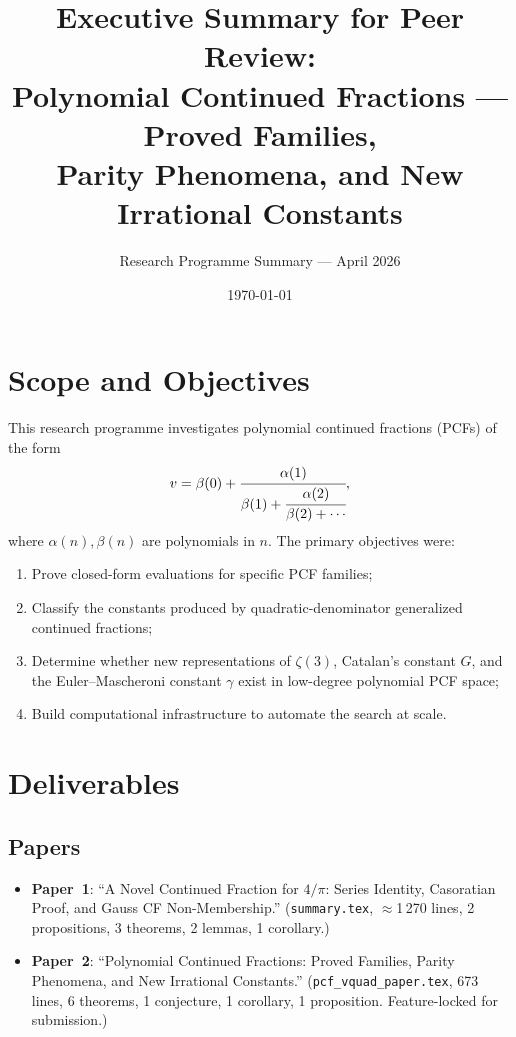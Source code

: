 \documentclass[11pt,a4paper]{article}
\title{Executive Summary for Peer Review:\\
Polynomial Continued Fractions — Proved Families,\\Parity Phenomena, and New Irrational Constants}
\author{Research Programme Summary — April 2026}
\date{\today}
\begin{document}
\maketitle

\section{Scope and Objectives}

This research programme investigates polynomial continued fractions (PCFs) of the form
\[
  v = \beta(0) + \cfrac{\alpha(1)}{\beta(1) + \cfrac{\alpha(2)}{\beta(2) + \cdots}},
\]
where $\alpha(n), \beta(n)$ are polynomials in $n$.  The primary objectives were:
\begin{enumerate}
\item Prove closed-form evaluations for specific PCF families;
\item Classify the constants produced by quadratic-denominator generalized continued fractions;
\item Determine whether new representations of $\zeta(3)$, Catalan's constant $G$, and the Euler--Mascheroni constant $\gamma$ exist in low-degree polynomial PCF space;
\item Build computational infrastructure to automate the search at scale.
\end{enumerate}

\section{Deliverables}

\subsection{Papers}
\begin{itemize}
\item \textbf{Paper~1}: ``A Novel Continued Fraction for $4/\pi$: Series Identity, Casoratian Proof, and Gauss CF Non-Membership.''  (\texttt{summary.tex}, $\approx$1\,270 lines, 2 propositions, 3 theorems, 2 lemmas, 1 corollary.)
\item \textbf{Paper~2}: ``Polynomial Continued Fractions: Proved Families, Parity Phenomena, and New Irrational Constants.''  (\texttt{pcf\_vquad\_paper.tex}, 673 lines, 6 theorems, 1 conjecture, 1 corollary, 1 proposition.  Feature-locked for submission.)
\end{itemize}
\end{document}
